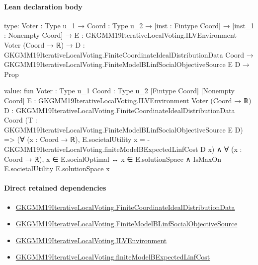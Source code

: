 \documentclass[10pt]{article}
\begin{document}
\paragraph{Lean declaration body}
\begin{ReviewVerbatim}
type:
{Voter : Type u_1} →
  {Coord : Type u_2} →
    [inst : Fintype Coord] →
      [inst_1 : Nonempty Coord] →
        {E : GKGMM19IterativeLocalVoting.ILVEnvironment Voter (Coord → ℝ)} →
          {D : GKGMM19IterativeLocalVoting.FiniteCoordinateIdealDistributionData Coord} →
            GKGMM19IterativeLocalVoting.FiniteModelBLinfSocialObjectiveSource E D → Prop

value:
fun {Voter : Type u_1} {Coord : Type u_2} [Fintype Coord] [Nonempty Coord]
    {E : GKGMM19IterativeLocalVoting.ILVEnvironment Voter (Coord → ℝ)}
    {D : GKGMM19IterativeLocalVoting.FiniteCoordinateIdealDistributionData Coord}
    (T : GKGMM19IterativeLocalVoting.FiniteModelBLinfSocialObjectiveSource E D) =>
  (∀ (x : Coord → ℝ), E.societalUtility x = -GKGMM19IterativeLocalVoting.finiteModelBExpectedLinfCost D x) ∧
    ∀ (x : Coord → ℝ), x ∈ E.socialOptimal ↔ x ∈ E.solutionSpace ∧ IsMaxOn E.societalUtility E.solutionSpace x
\end{ReviewVerbatim}

\paragraph{Direct retained dependencies}
\begin{itemize}\raggedright
\item \hyperlink{governing-declaration-57171116eb928bf6}{GKGMM19\allowbreak{}Iterative\allowbreak{}Local\allowbreak{}Voting.\allowbreak{}Finite\allowbreak{}Coordinate\allowbreak{}Ideal\allowbreak{}Distribution\allowbreak{}Data}
\item \hyperlink{governing-declaration-e514cb09354be3be}{GKGMM19\allowbreak{}Iterative\allowbreak{}Local\allowbreak{}Voting.\allowbreak{}Finite\allowbreak{}Model\allowbreak{}B\allowbreak{}Linf\allowbreak{}Social\allowbreak{}Objective\allowbreak{}Source}
\item \hyperlink{governing-declaration-df2ca62df1846667}{GKGMM19\allowbreak{}Iterative\allowbreak{}Local\allowbreak{}Voting.\allowbreak{}ILV\allowbreak{}Environment}
\item \hyperlink{governing-declaration-e3c104680ee7d475}{GKGMM19\allowbreak{}Iterative\allowbreak{}Local\allowbreak{}Voting.\allowbreak{}finite\allowbreak{}Model\allowbreak{}B\allowbreak{}Expected\allowbreak{}Linf\allowbreak{}Cost}
\end{itemize}
\hypertarget{governing-declaration-4d7ded2f77d1d03d}{}
\end{document}
